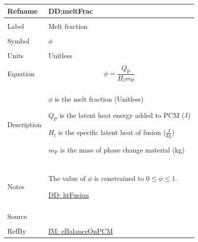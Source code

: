 \documentclass[12pt]{article}
\begin{document}
\vspace{\baselineskip}
\noindent
\begin{minipage}{\textwidth}
\begin{tabular}{>{\raggedright}p{}>{\raggedright\arraybackslash}p{}}
\toprule \textbf{Refname} & \textbf{DD:meltFrac}
\label{DD:meltFrac}
\\ \midrule \\
Label & Melt fraction
        
\\ \midrule \\
Symbol & $ϕ$
         
\\ \midrule \\
Units & Unitless
        
\\ \midrule \\
Equation & \begin{displaymath}
           ϕ=\frac{{Q_{\text{P}}}}{{H_{\text{f}}} {m_{\text{P}}}}
           \end{displaymath}
\\ \midrule \\
Description & \begin{symbDescription}
              \item{$ϕ$ is the melt fraction (Unitless)}
              \item{${Q_{\text{P}}}$ is the latent heat energy added to PCM (J)}
              \item{${H_{\text{f}}}$ is the specific latent heat of fusion ($\frac{\text{J}}{\text{kg}}$)}
              \item{${m_{\text{P}}}$ is the mass of phase change material (kg)}
              \end{symbDescription}
\\ \midrule \\
Notes & The value of $ϕ$ is constrained to $0\leq{}ϕ\leq{}1$.
        
        \hyperref[DD:htFusion]{DD: htFusion}
        
\\ \midrule \\
Source & \cite{koothoor2013}
         
\\ \midrule \\
RefBy & \hyperref[IM:eBalanceOnPCM]{IM: eBalanceOnPCM}
        
\\ \bottomrule
\end{tabular}
\end{minipage}
\end{document}

